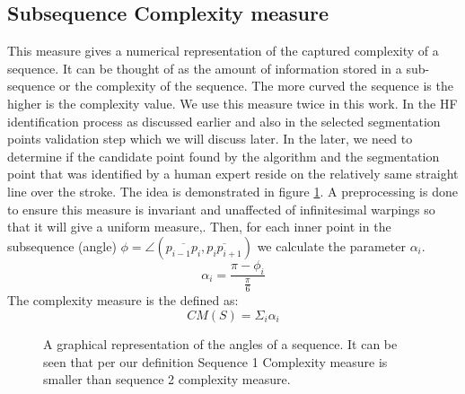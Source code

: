 \documentclass[journal,compsoc]{IEEEtran}
\begin{document}
\subsection{Subsequence Complexity measure }
\label{subsec:scm}
This measure gives a numerical representation of the captured complexity of a sequence. It can be thought of as the amount of information stored in a sub-sequence or the complexity of the sequence. The more curved the sequence is the higher is the complexity value. We use this measure twice in this work. In the HF identification process as discussed earlier and also in the selected segmentation points validation step which we will discuss later. In the later, we need to determine if the candidate point found by the algorithm and the segmentation point that was identified by a human expert reside on the relatively same straight line over the stroke. The idea is demonstrated in figure \ref{fig:sequence_complexity}.
A preprocessing is done to ensure this measure is invariant and unaffected of infinitesimal warpings so that it will give a uniform measure,. 
Then, for each inner point in the subsequence (angle) $\phi=\angle(\overline{p_{i-1}p_{i}},\overline{p_{i}p_{i+1}})$ we calculate the parameter $\alpha_{i}$.
\begin{equation}
 \alpha_{i}=\frac{\pi-\phi_{i}}{\frac{\pi}{6}}
\end{equation}
The complexity measure is the defined as:
\begin{equation}
CM(S)=\Sigma_{i}\alpha_{i}
\end{equation}

\begin{figure}[h]
     \begin{center}
    \end{center}
    \caption{A graphical representation of the angles of a sequence. It can be seen that per our definition Sequence 1 Complexity measure is smaller than sequence 2 complexity measure.}
   \label{fig:sequence_complexity}
\end{figure}
\end{document}
